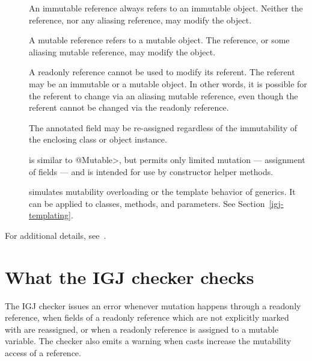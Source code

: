 \begin{description}

\item[]
  An immutable reference always refers to an immutable object.  Neither the
  reference, nor any aliasing reference, may modify the object.

\item[]
  A mutable reference refers to a mutable object.  The reference, or some
  aliasing mutable reference, may modify the object.

\item[]
  A readonly reference cannot be used to modify its referent.  The referent
  may be an immutable or a mutable object.  In other words, it is possible
  for the referent to change via an aliasing mutable reference, even though
  the referent cannot be changed via the readonly reference.

\item[]
  The annotated field may be re-assigned regardless of the
  immutability of the enclosing class or object instance.

\item[]
  is similar to \<@Mutable>, but permits only limited mutation ---
  assignment of fields --- and is intended for use by constructor helper
  methods.

\item[]
  simulates mutability overloading or the template behavior of generics.
  It can be applied to classes, methods, and parameters.  See
  Section~\ref{igj-templating}.

\end{description}

For additional details, see~\cite{ZibinPAAKE2007}.


\section{What the IGJ checker checks\label{igj-checks}}

The IGJ checker issues an error whenever mutation happens through a
readonly reference, when fields of a readonly reference which are not
explicitly marked with  are
reassigned, or when a readonly reference is assigned to a mutable
variable.  The checker also emits a warning when casts increase the
mutability access of a reference.

